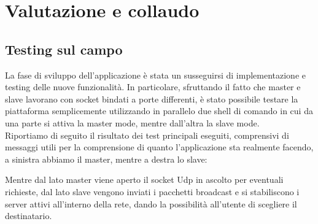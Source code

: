 \documentclass[11pt,fleqn]{book} %
\begin{document}

\chapter{Valutazione e collaudo}

\section{Testing sul campo}
La fase di sviluppo dell'applicazione è stata un susseguirsi di implementazione e testing delle nuove funzionalità. In particolare, sfruttando il fatto che master e slave lavorano con socket bindati a porte differenti, è stato possibile testare la piattaforma semplicemente utilizzando in parallelo due shell di comando in cui da una parte si attiva la master mode, mentre dall'altra la slave mode.\\
Riportiamo di seguito il risultato dei test principali eseguiti, comprensivi di messaggi utili per la comprensione di quanto l'applicazione sta realmente facendo, a sinistra abbiamo il master, mentre a destra lo slave:

\begin{Parallel}{0.5\textwidth}{0.5\textwidth}
\ParallelPar
\end{Parallel}

Mentre dal lato master viene aperto il socket Udp in ascolto per eventuali richieste, dal lato slave vengono inviati i pacchetti 				broadcast e si stabiliscono i server attivi all'interno della rete, dando la possibilità all'utente di scegliere il destinatario.

\begin{Parallel}{0.5\textwidth}{0.5\textwidth}
\ParallelPar
\end{Parallel}
\end{document}
